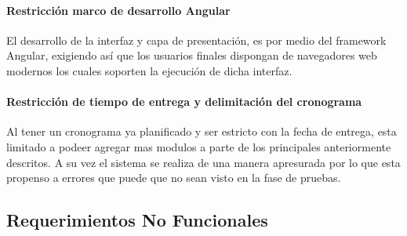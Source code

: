 \paragraph{Restricción marco de desarrollo Angular} El desarrollo de la interfaz y capa de presentación, es por medio del framework Angular, exigiendo así que los usuarios finales dispongan de navegadores web modernos los cuales soporten la ejecución de dicha interfaz.


\paragraph{Restricción de tiempo de entrega y delimitación del cronograma}
Al tener un cronograma ya planificado y ser estricto con la fecha de entrega, esta limitado a podeer agregar mas modulos a parte de los principales anteriormente descritos. A su vez el sistema se realiza de una manera apresurada por lo que esta propenso a errores que puede que no sean visto en la fase de pruebas.

\subsection{Requerimientos No Funcionales}

